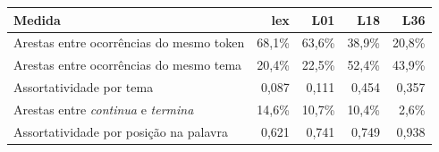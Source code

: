 \begin{tabular}{lrrrr}
\toprule
Medida & lex & L01 & L18 & L36 \\
\midrule
Arestas entre ocorrências do mesmo token & 68,1\% & 63,6\% & 38,9\% & 20,8\% \\
Arestas entre ocorrências do mesmo tema & 20,4\% & 22,5\% & 52,4\% & 43,9\% \\
Assortatividade por tema & 0,087 & 0,111 & 0,454 & 0,357 \\
Arestas entre \emph{continua} e \emph{termina} & 14,6\% & 10,7\% & 10,4\% & 2,6\% \\
Assortatividade por posição na palavra & 0,621 & 0,741 & 0,749 & 0,938 \\
\bottomrule
\end{tabular}
